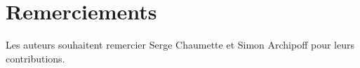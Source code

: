 \documentclass[10pt]{article}
\begin{document}


\section{Remerciements}
Les auteurs souhaitent remercier Serge Chaumette et Simon Archipoff pour leurs contributions.

\printbibliography 
\end{document}
